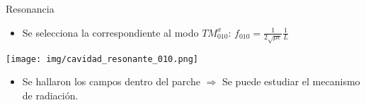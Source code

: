 


\begin{frame}{Resonancia}

\begin{itemize}
    \item<1-> Se selecciona la correspondiente al modo $TM^x_{010}$: $f_{010} = \frac{1}{2 \sqrt{\mu \epsilon}} \frac{1}{L}$
\end{itemize}

\begin{center}
    \texttt{[image: img/cavidad\_resonante\_010.png]}
\end{center}

\begin{itemize}
    \item<3-> Se hallaron los campos dentro del parche $\Rightarrow$ Se puede estudiar el mecanismo de radiación.
\end{itemize}

\end{frame}

